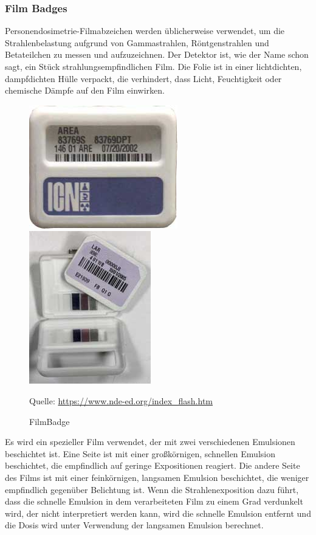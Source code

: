 {\subsubsection{Film Badges}
Personendosimetrie-Filmabzeichen werden üblicherweise verwendet, um die Strahlenbelastung aufgrund von Gammastrahlen, Röntgenstrahlen und Betateilchen zu messen und aufzuzeichnen. Der Detektor ist, wie der Name schon sagt, ein Stück strahlungsempfindlichen Film. Die Folie ist in einer lichtdichten, dampfdichten Hülle verpackt, die verhindert, dass Licht, Feuchtigkeit oder chemische Dämpfe auf den Film einwirken.
\begin{figure}[htb]
   \includegraphics[scale=0.7]{img/area-filmbadge.jpg}\\
   \includegraphics[scale=0.5]{img/FilmBadge.jpg}\\
  \caption{FilmBadge}
  \label{fig:FilmBadge}
  Quelle: \url{https://www.nde-ed.org/index_flash.htm}
\end{figure}
Es wird ein spezieller Film verwendet, der mit zwei verschiedenen Emulsionen beschichtet ist. Eine Seite ist mit einer großkörnigen, schnellen Emulsion beschichtet, die empfindlich auf geringe Expositionen reagiert. Die andere Seite des Films ist mit einer feinkörnigen, langsamen Emulsion beschichtet, die weniger empfindlich gegenüber Belichtung ist. Wenn die Strahlenexposition dazu führt, dass die schnelle Emulsion in dem verarbeiteten Film zu einem Grad verdunkelt wird, der nicht interpretiert werden kann, wird die schnelle Emulsion entfernt und die Dosis wird unter Verwendung der langsamen Emulsion berechnet.
}
